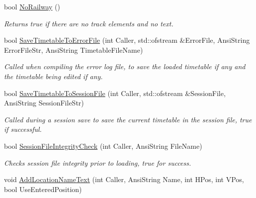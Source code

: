\begin{DoxyCompactItemize}
\item 
\mbox{\label{class_t_interface_a488e772a2e2a52820fdbe1d1695e0118}} 
bool \mbox{\hyperlink{class_t_interface_a488e772a2e2a52820fdbe1d1695e0118}{No\+Railway}} ()
\begin{DoxyCompactList}\small\item\em Returns true if there are no track elements and no text. \end{DoxyCompactList}\item 
\mbox{\label{class_t_interface_af2ff1eef8152e33d0025ec7cd250fc08}} 
bool \mbox{\hyperlink{class_t_interface_af2ff1eef8152e33d0025ec7cd250fc08}{Save\+Timetable\+To\+Error\+File}} (int Caller, std\+::ofstream \&Error\+File, Ansi\+String Error\+File\+Str, Ansi\+String Timetable\+File\+Name)
\begin{DoxyCompactList}\small\item\em Called when compiling the error log file, to save the loaded timetable if any and the timetable being edited if any. \end{DoxyCompactList}\item 
\mbox{\label{class_t_interface_af6cda9d0f26c60eb3810c2523b830c25}} 
bool \mbox{\hyperlink{class_t_interface_af6cda9d0f26c60eb3810c2523b830c25}{Save\+Timetable\+To\+Session\+File}} (int Caller, std\+::ofstream \&Session\+File, Ansi\+String Session\+File\+Str)
\begin{DoxyCompactList}\small\item\em Called during a session save to save the current timetable in the session file, true if successful. \end{DoxyCompactList}\item 
\mbox{\label{class_t_interface_a3904f26b67b9512507960187b37b6f7b}} 
bool \mbox{\hyperlink{class_t_interface_a3904f26b67b9512507960187b37b6f7b}{Session\+File\+Integrity\+Check}} (int Caller, Ansi\+String File\+Name)
\begin{DoxyCompactList}\small\item\em Checks session file integrity prior to loading, true for success. \end{DoxyCompactList}\item 
void \mbox{\hyperlink{class_t_interface_a27f00bc593500756b06fb2aeae9d28e1}{Add\+Location\+Name\+Text}} (int Caller, Ansi\+String Name, int H\+Pos, int V\+Pos, bool Use\+Entered\+Position)

\end{DoxyCompactItemize}
